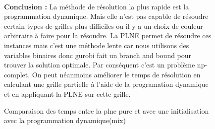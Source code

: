 \documentclass[a4paper]{memoir}
\begin{document}
\begin{figure}[h]
\caption{Comparaison des temps entre la plne pure et avec une initialisation avec la programmation dynamique(mix)}
\\
\textbf{Conclusion : }La méthode de résolution la plus rapide est la programmation dynamique. Mais elle n'est pas capable de résoudre certain types de grilles plus difficiles ou il y a un choix de couleur arbitraire à faire pour la résoudre. La PLNE permet de résoudre ces instances mais c'est une méthode lente car nous utilisons des variables binaires donc gurobi fait un branch and bound pour trouver la solution optimale. Par conséquent c'est un problème np-complet. On peut néanmoins améliorer le temps de résolution en calculant une grille partielle à l'aide de la programation dynamique et en appliquant la PLNE sur cette grille.
\end{figure}

        
\end{document}

